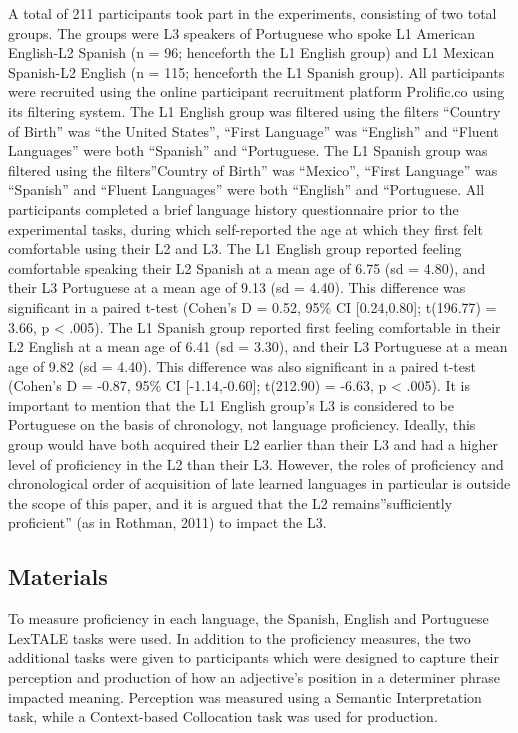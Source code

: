 \documentclass[
  man,floatsintext]{apa6}
\begin{document}
A total of 211 participants took part in the experiments, consisting of two total groups.
The groups were L3 speakers of Portuguese who spoke L1 American English-L2 Spanish (n = 96; henceforth the L1 English group) and L1 Mexican Spanish-L2 English (n = 115; henceforth the L1 Spanish group).
All participants were recruited using the online participant recruitment platform Prolific.co using its filtering system.
The L1 English group was filtered using the filters ``Country of Birth'' was ``the United States'', ``First Language'' was ``English'' and ``Fluent Languages'' were both ``Spanish'' and ``Portuguese.
The L1 Spanish group was filtered using the filters''Country of Birth'' was ``Mexico'', ``First Language'' was ``Spanish'' and ``Fluent Languages'' were both ``English'' and ``Portuguese.
All participants completed a brief language history questionnaire prior to the experimental tasks, during which self-reported the age at which they first felt comfortable using their L2 and L3.
The L1 English group reported feeling comfortable speaking their L2 Spanish at a mean age of 6.75 (sd = 4.80), and their L3 Portuguese at a mean age of 9.13 (sd = 4.40).
This difference was significant in a paired t-test (Cohen's D = 0.52, 95\% CI {[}0.24,0.80{]}; t(196.77) = 3.66, p \textless{} .005).
The L1 Spanish group reported first feeling comfortable in their L2 English at a mean age of 6.41 (sd = 3.30), and their L3 Portuguese at a mean age of 9.82 (sd = 4.40).
This difference was also significant in a paired t-test (Cohen's D = -0.87, 95\% CI {[}-1.14,-0.60{]}; t(212.90) = -6.63, p \textless{} .005).
It is important to mention that the L1 English group's L3 is considered to be Portuguese on the basis of chronology, not language proficiency.
Ideally, this group would have both acquired their L2 earlier than their L3 and had a higher level of proficiency in the L2 than their L3.
However, the roles of proficiency and chronological order of acquisition of late learned languages in particular is outside the scope of this paper, and it is argued that the L2 remains''sufficiently proficient'' (as in Rothman, 2011) to impact the L3.

\hypertarget{materials}{%
\subsection{Materials}\label{materials}}

To measure proficiency in each language, the Spanish, English and Portuguese LexTALE tasks were used.
In addition to the proficiency measures, the two additional tasks were given to participants which were designed to capture their perception and production of how an adjective's position in a determiner phrase impacted meaning.
Perception was measured using a Semantic Interpretation task, while a Context-based Collocation task was used for production.
\end{document}
